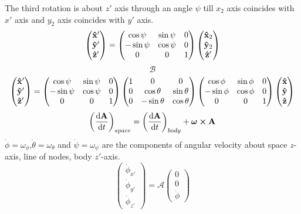 \documentclass[12pt]{article}
\begin{document}
The third rotation is about $z'$ axis through an angle $\psi$ till $x_2$ axis coincides with $x'$ axis and $y_2$ axis coincides with $y'$ axis.
\[
\begin{pmatrix}
\vu{x}'\\ \vu{y}'\\ \vu{z}'
\end{pmatrix}
=
\begin{pmatrix}
\cos\psi& \sin\psi& 0 \\
-\sin\psi& \cos\psi& 0 \\
0& 0& 1
\end{pmatrix}
\begin{pmatrix}
\vu{x}_2\\ \vu{y}_2\\ \vu{z}'
\end{pmatrix}
\]
\[\mathcal{B}\]
\[
\begin{pmatrix}
\vu{x}'\\ \vu{y}'\\ \vu{z}'
\end{pmatrix}
=
\begin{pmatrix}
\cos\psi& \sin\psi& 0 \\
-\sin\psi& \cos\psi& 0 \\
0& 0& 1
\end{pmatrix}
\begin{pmatrix}
1& 0& 0 \\
0& \cos\theta& \sin\theta\\
0& -\sin\theta& \cos\theta
\end{pmatrix}
\begin{pmatrix}
\cos\phi& \sin\phi& 0\\
-\sin\phi& \cos\phi& 0\\
0& 0& 1
\end{pmatrix}
\begin{pmatrix}
\vu{x}\\ \vu{y}\\ \vu{z}
\end{pmatrix}
\]
\[\qty(\dv{\vb{A}}{t})_{space}=\qty(\dv{\vb{A}}{t})_{body}+\bm{\omega}\cp\vb{A}\]
$\dot{\phi}=\omega_{\phi}$,$\dot{\theta}=\omega_{\theta}$ and $\dot{\psi}=\omega_{\psi}$ are the components of angular velocity about space $z$-axis, line of nodes, body $z'$-axis.
\[
\begin{pmatrix}
\dot{\phi}_{x'}\\
\dot{\phi}_{y'}\\
\dot{\phi}_{z'}
\end{pmatrix}
=\mathcal{A}
\begin{pmatrix}
0\\0\\\dot{\phi}
\end{pmatrix}
\]
\end{document}
